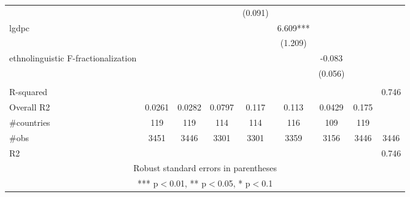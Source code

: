 \documentclass[]{article}
\begin{document}
\begin{tabular}{lcccccccc}
 &  &  &  & (0.091) &  &  &  &  \\
lgdpc &  &  &  &  & 6.609*** &  &  &  \\
 &  &  &  &  & (1.209) &  &  &  \\
ethnolinguistic F-fractionalization &  &  &  &  &  & -0.083 &  &  \\
 &  &  &  &  &  & (0.056) &  &  \\
 &  &  &  &  &  &  &  &  \\
R-squared &  &  &  &  &  &  &  & 0.746 \\
Overall R2 & 0.0261 & 0.0282 & 0.0797 & 0.117 & 0.113 & 0.0429 & 0.175 &  \\
\#countries & 119 & 119 & 114 & 114 & 116 & 109 & 119 &  \\
\#obs & 3451 & 3446 & 3301 & 3301 & 3359 & 3156 & 3446 & 3446 \\
 R2 &  &  &  &  &  &  &  & 0.746 \\ \hline
\multicolumn{9}{c}{ Robust standard errors in parentheses} \\
\multicolumn{9}{c}{ *** p$<$0.01, ** p$<$0.05, * p$<$0.1} \\
\end{tabular}
\end{document}
